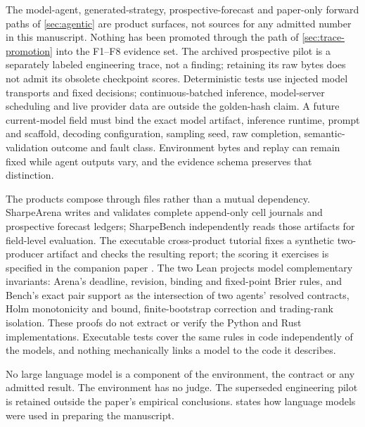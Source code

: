 The model-agent, generated-strategy, prospective-forecast and paper-only forward paths of \cref{sec:agentic} are product surfaces, not sources for any admitted number in this manuscript. Nothing has been promoted through the path of \cref{sec:trace-promotion} into the F1--F8 evidence set. The archived prospective pilot is a separately labeled engineering trace, not a finding; retaining its raw bytes does not admit its obsolete checkpoint scores. Deterministic tests use injected model transports and fixed decisions; continuous-batched inference, model-server scheduling and live provider data are outside the golden-hash claim. A future current-model field must bind the exact model artifact, inference runtime, prompt and scaffold, decoding configuration, sampling seed, raw completion, semantic-validation outcome and fault class. Environment bytes and replay can remain fixed while agent outputs vary, and the evidence schema preserves that distinction.

The products compose through files rather than a mutual dependency. SharpeArena writes and validates complete append-only cell journals and prospective forecast ledgers; SharpeBench independently reads those artifacts for field-level evaluation. The executable cross-product tutorial fixes a synthetic two-producer artifact and checks the resulting report; the scoring it exercises is specified in the companion paper \citep{toca2026sharpebench}. The two Lean projects model complementary invariants: Arena's deadline, revision, binding and fixed-point Brier rules, and Bench's exact pair support as the intersection of two agents' resolved contracts, Holm monotonicity and bound, finite-bootstrap correction and trading-rank isolation. These proofs do not extract or verify the Python and Rust implementations. Executable tests cover the same rules in code independently of the models, and nothing mechanically links a model to the code it describes.

No large language model is a component of the environment, the contract or any admitted result. The environment has no judge. The superseded engineering pilot is retained outside the paper's empirical conclusions.  states how language models were used in preparing the manuscript.
